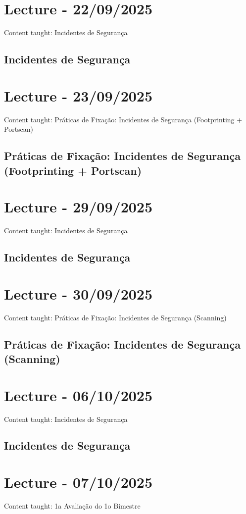 \documentclass{article}
\begin{document}
\section{Lecture - 22/09/2025}
Content taught: Incidentes de Segurança
\subsection{Incidentes de Segurança}

\section{Lecture - 23/09/2025}
Content taught: Práticas de Fixação: Incidentes de Segurança (Footprinting + Portscan)
\subsection{Práticas de Fixação: Incidentes de Segurança (Footprinting + Portscan)}

\section{Lecture - 29/09/2025}
Content taught: Incidentes de Segurança
\subsection{Incidentes de Segurança}

\section{Lecture - 30/09/2025}
Content taught: Práticas de Fixação: Incidentes de Segurança (Scanning)
\subsection{Práticas de Fixação: Incidentes de Segurança (Scanning)}

\section{Lecture - 06/10/2025}
Content taught: Incidentes de Segurança
\subsection{Incidentes de Segurança}

\section{Lecture - 07/10/2025}
Content taught: 1a Avaliação do 1o Bimestre
\end{document}
